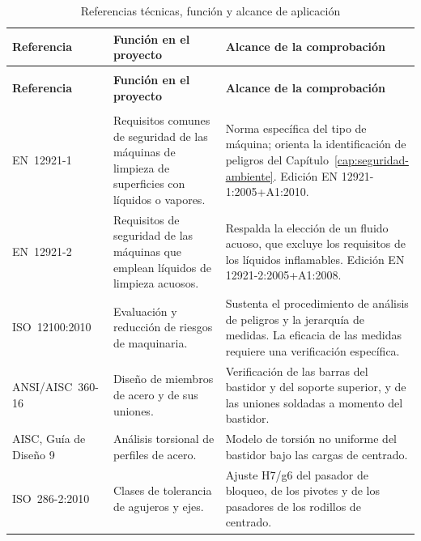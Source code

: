 \begingroup
\small
\singlespacing
\setlength{\parskip}{0pt}
\setlength{\tabcolsep}{4pt}
\renewcommand{\arraystretch}{1.12}
\begin{longtable}{@{}>{\raggedright\arraybackslash}p{}>{\raggedright\arraybackslash}p{}>{\raggedright\arraybackslash}p{}@{}}
\caption{Referencias técnicas, función y alcance de aplicación}\label{tab:normas-funcion}\\
\toprule
\textbf{Referencia} & \textbf{Función en el proyecto} & \textbf{Alcance de la comprobación} \\
\midrule
\endfirsthead
\multicolumn{3}{@{}l}{\small Tabla~\thetable\ (continuación)}\\
\toprule
\textbf{Referencia} & \textbf{Función en el proyecto} & \textbf{Alcance de la comprobación} \\
\midrule
\endhead
\midrule
\multicolumn{3}{r@{}}{\small Continúa en la página siguiente}\\
\endfoot
\bottomrule
\endlastfoot
EN~12921-1 \cite{en12921_1} & Requisitos comunes de seguridad de las máquinas de limpieza de superficies con líquidos o vapores. & Norma específica del tipo de máquina; orienta la identificación de peligros del Capítulo~\ref{cap:seguridad-ambiente}. Edición EN 12921-1:2005+A1:2010. \\
\addlinespace[4pt]
EN~12921-2 \cite{en12921_2} & Requisitos de seguridad de las máquinas que emplean líquidos de limpieza acuosos. & Respalda la elección de un fluido acuoso, que excluye los requisitos de los líquidos inflamables. Edición EN 12921-2:2005+A1:2008. \\
\addlinespace[4pt]
ISO~12100:2010 \cite{iso12100} & Evaluación y reducción de riesgos de maquinaria. & Sustenta el procedimiento de análisis de peligros y la jerarquía de medidas. La eficacia de las medidas requiere una verificación específica. \\
\addlinespace[4pt]
ANSI/AISC~360-16 \cite{aisc360} & Diseño de miembros de acero y de sus uniones. & Verificación de las barras del bastidor y del soporte superior, y de las uniones soldadas a momento del bastidor. \\
\addlinespace[4pt]
AISC, Guía de Diseño 9 \cite{aiscdg9} & Análisis torsional de perfiles de acero. & Modelo de torsión no uniforme del bastidor bajo las cargas de centrado. \\
\addlinespace[4pt]
ISO~286-2:2010 \cite{iso286} & Clases de tolerancia de agujeros y ejes. & Ajuste H7/g6 del pasador de bloqueo, de los pivotes y de los pasadores de los rodillos de centrado. \\

\end{longtable}
